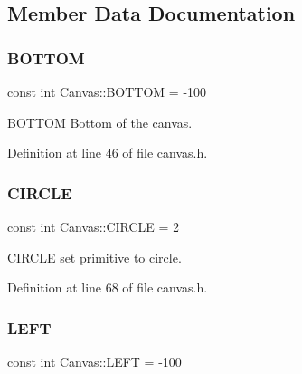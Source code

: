 \subsection{Member Data Documentation}
\mbox{\label{class_canvas_a0630c650c5daea2db5a01ce6c0954457}} 
\subsubsection{\texorpdfstring{B\+O\+T\+T\+OM}{BOTTOM}}
{\footnotesize\ttfamily const int Canvas\+::\+B\+O\+T\+T\+OM = -\/100\hspace{0.3cm}{\ttfamily [static]}}



B\+O\+T\+T\+OM Bottom of the canvas. 



Definition at line 46 of file canvas.\+h.

\mbox{\label{class_canvas_a6d5c5da10948c78b6481ac831f32106f}} 
\subsubsection{\texorpdfstring{C\+I\+R\+C\+LE}{CIRCLE}}
{\footnotesize\ttfamily const int Canvas\+::\+C\+I\+R\+C\+LE = 2\hspace{0.3cm}{\ttfamily [static]}}



C\+I\+R\+C\+LE set primitive to circle. 



Definition at line 68 of file canvas.\+h.

\mbox{\label{class_canvas_a7da74603fc4232dfe00be701878d048b}} 
\subsubsection{\texorpdfstring{L\+E\+FT}{LEFT}}
{\footnotesize\ttfamily const int Canvas\+::\+L\+E\+FT = -\/100\hspace{0.3cm}{\ttfamily [static]}}



